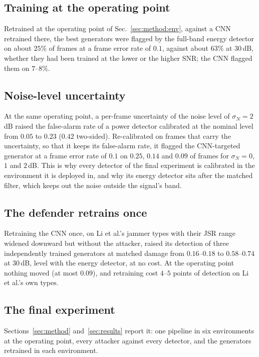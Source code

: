 \subsection{Training at the operating point}
Retrained at the operating point of Sec.~\ref{sec:method:env}, against a CNN retrained there, the best generators were flagged by the full-band energy detector on about $25\%$ of frames at a frame error rate of $0.1$, against about $63\%$ at $30$\,dB, whether they had been trained at the lower or the higher SNR; the CNN flagged them on $7$--$8\%$.

\subsection{Noise-level uncertainty}
At the same operating point, a per-frame uncertainty of the noise level of $\sigma_N=2$\,dB raised the false-alarm rate of a power detector calibrated at the nominal level from $0.05$ to $0.23$ ($0.42$ two-sided).
Re-calibrated on frames that carry the uncertainty, so that it keeps its false-alarm rate, it flagged the CNN-targeted generator at a frame error rate of $0.1$ on $0.25$, $0.14$ and $0.09$ of frames for $\sigma_N=0$, $1$ and $2$\,dB.
This is why every detector of the final experiment is calibrated in the environment it is deployed in, and why its energy detector sits after the matched filter, which keeps out the noise outside the signal's band.

\subsection{The defender retrains once}
Retraining the CNN once, on Li et al.'s jammer types with their JSR range widened downward but without the attacker, raised its detection of three independently trained generators at matched damage from $0.16$--$0.18$ to $0.58$--$0.74$ at $30$\,dB, level with the energy detector, at no cost.
At the operating point nothing moved (at most $0.09$), and retraining cost $4$--$5$ points of detection on Li et al.'s own types.

\subsection{The final experiment}
Sections~\ref{sec:method} and~\ref{sec:results} report it: one pipeline in six environments at the operating point, every attacker against every detector, and the generators retrained in each environment.

